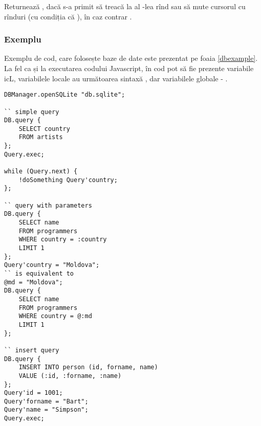 Returnează \true, dacă s-a primit să treacă la al -lea rînd sau să mute cursorul cu  rînduri (cu condiția că ), în caz contrar \false.

\subsubsection{Exemplu}

Exemplu de cod, care folosește baze de date este prezentat pe foaia \ref{dbexample}. La fel ca și la executarea codului Javascript, în cod pot să fie prezente variabile icL, variabilele locale au următoarea sintaxă , dar variabilele globale - .

\newpage
\begin{lstlisting}[caption=Exemplu de cod care folosește baze de date, label=dbexample]
DBManager.openSQLite "db.sqlite";

`` simple query
DB.query {
	SELECT country
	FROM artists
};
Query.exec;

while (Query.next) {
	!doSomething Query'country;
};

`` query with parameters
DB.query {
	SELECT name
	FROM programmers
	WHERE country = :country
	LIMIT 1
};
Query'country = "Moldova";
`` is equivalent to
@md = "Moldova";
DB.query {
	SELECT name
	FROM programmers
	WHERE country = @:md
	LIMIT 1
};

`` insert query
DB.query {
	INSERT INTO person (id, forname, name)
	VALUE (:id, :forname, :name)
};
Query'id = 1001;
Query'forname = "Bart";
Query'name = "Simpson";
Query.exec;
\end{lstlisting}

